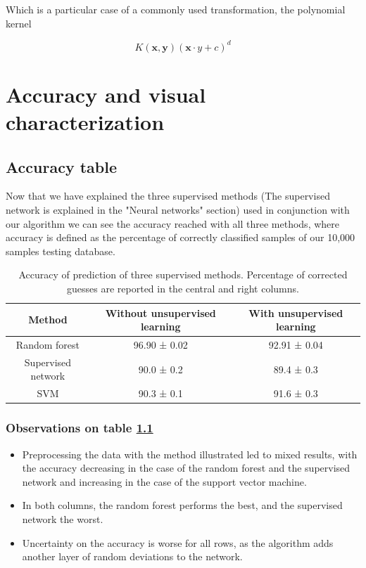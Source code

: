 \documentclass[a4paper]{report}
\begin{document}
Which is a particular case of a commonly used transformation, the polynomial kernel

\begin{equation}
	K(\textbf{x},\textbf{y})(\textbf{x}\cdot{y}+c)^d
\end{equation}


\chapter{Accuracy and visual characterization}

\section{Accuracy table}

Now that we have explained the three supervised methods (The supervised network is explained in the "Neural networks" section) used in conjunction with our algorithm we can see the accuracy reached with all three methods, where accuracy is defined as the percentage of correctly classified samples of our 10,000 samples testing database.

\begin{table}[h!]
  \begin{center}
    \begin{tabular}{c|c|c} %
      \textbf{Method} & \textbf{Without unsupervised learning} & \textbf{With unsupervised learning}\\
      \hline
      Random forest & 96.90  ± 0.02 & 92.91 ± 0.04\\
      Supervised network & 90.0 ± 0.2 & 89.4 ± 0.3 \\
      SVM & 90.3 ± 0.1 & 91.6 ± 0.3 \\
    \end{tabular}
  \end{center}
  \caption{Accuracy of prediction of three supervised methods. Percentage of corrected guesses are reported in the central and right columns.}
  \label{bbb}
\end{table}

\subsection{Observations on table \ref{bbb}}

\begin{itemize}
    \item Preprocessing the data with the method illustrated led to mixed results, with the accuracy decreasing in the case of the random forest and the supervised network and increasing in the case of the support vector machine.
    \item In both columns, the random forest performs the best, and the supervised network the worst.
    \item Uncertainty on the accuracy is worse for all rows, as the algorithm adds another layer of random deviations to the network.
\end{itemize}
\end{document}
